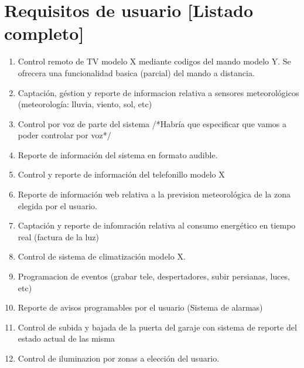 \section{Requisitos de usuario [Listado completo]}
    \begin{enumerate}
            \item Control remoto de TV modelo X mediante codigos del mando modelo Y. Se ofrecera una funcionalidad basica (parcial) del mando a distancia.

            \item Captación, géstion y reporte de informacion relativa a sensores meteorológicos (meteorología: lluvia, viento, sol, etc)

            \item Control por voz de parte del sistema /*Habría que especificar que vamos a poder controlar por voz*/

            \item Reporte de información del sistema en formato audible.

            \item Control y reporte de información del telefonillo modelo X

            \item Reporte de información web relativa a la prevision meteorológica de la zona elegida por el usuario.

            \item Captación y reporte de infomración relativa al consumo energético en tiempo real (factura de la luz)

            \item Control de sistema de climatización modelo X.

            \item Programacion de eventos (grabar tele, despertadores, subir persianas, luces, etc)

            \item Reporte de avisos programables por el usuario (Sistema de alarmas)

            \item Control de subida y bajada de la puerta del garaje con sistema de reporte del estado actual de las misma

            \item Control de iluminazion por zonas a elección del usuario.


\end{enumerate}
